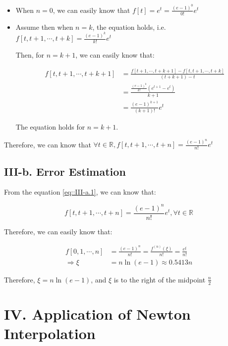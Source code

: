 \documentclass[a4paper]{article}
\begin{document}
\begin{itemize}
  \item When $n=0$, we can easily know that $f[t] = e^t = \frac{(e-1)^0}{0!}e^t$
  \item Assume then when $n=k$, the equation holds, i.e. $f[t,t+1,\cdots, t+k] = \frac{(e-1)^k}{k!}e^t$
  
  Then, for $n=k+1$, we can easily know that:

  \begin{equation}
    \begin{aligned}
      f[t,t+1,\cdots, t+k+1] &= \frac{f[t+1,\cdots, t+k+1] - f[t,t+1,\cdots, t+k]}{(t+k+1) - t} \\
                             &= \frac{\frac{(e-1)^k}{k!} (e^{t+1} - e^t)}{k+1} \\
                             &= \frac{(e-1)^{k+1}}{(k+1)!}e^t
    \end{aligned}
    \label{eq::III-a.1}
  \end{equation}

  The equation holds for $n=k+1$.
\end{itemize}

Therefore, we can know that $\forall t\in \mathbb{R}, f[t,t+1,\cdots, t+n] = \frac{(e-1)^n}{n!}e^t$

\subsection*{III-b. Error Estimation}

From the equation \ref{eq::III-a.1}, we can know that:

\begin{equation}
    f[t,t+1,\cdots, t+n] = \frac{(e-1)^n}{n!}e^t, \forall t\in \mathbb{R}
\end{equation}

Therefore, we can easily know that:

\begin{equation}
  \begin{aligned}
    f[0,1,\cdots, n] &= \frac{(e-1)^n}{n!} = \frac{f^{(n)}(\xi)}{n!} = \frac{e^{\xi}}{n!} \\
    \Rightarrow \xi &= n \ln(e-1) \approx 0.5413n
  \end{aligned}
\end{equation}

Therefore, $\xi = n \ln(e-1)$, and $\xi$ is to the right of the midpoint $\frac{n}{2}$

\section*{IV. Application of Newton Interpolation}
\end{document}
